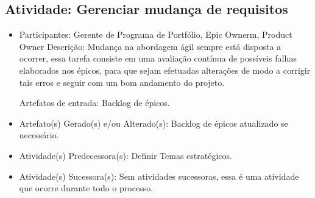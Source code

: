 \subsection{Atividade: Gerenciar mudança de requisitos}
\begin{itemize}
\item Participantes: Gerente de Programa de Portfólio, Epic Ownerm, Product Owner
Descrição: Mudança na abordagem ágil sempre está disposta a ocorrer, essa tarefa consiste em uma avaliação contínua de possíveis falhas elaborados nos épicos, para que sejam efetuadas alterações de modo a corrigir tais erros e seguir com um bom andamento do projeto.

Artefatos de entrada:
    Backlog de épicos.
 
\item Artefato(s) Gerado(s) e/ou Alterado(s): Backlog de épicos atualizado se necessário.
\item Atividade(s) Predecessora(s): Definir Temas estratégicos.
\item Atividade(s) Sucessora(s): Sem atividades sucessoras, essa é uma atividade que ocorre durante todo o processo.

\end{itemize}



